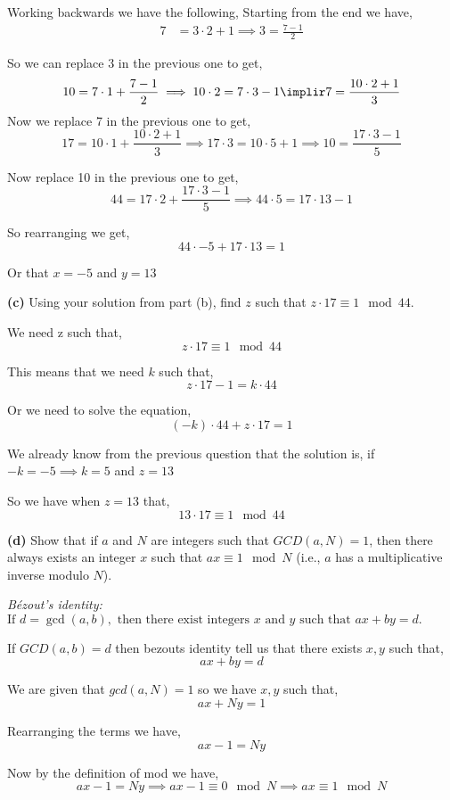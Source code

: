 \documentclass[12pt]{article}
\newcommand{\question}[3][Q]{
\begin{description}
\item \textbf{#1{#2}} #3
\end{description}
}
\newcommand{\hint}[1]{{\footnotesize
    \begin{description}
    [leftmargin=3.3em,style=nextline]
        \item[Hint:] {#1}
    \end{description}}   
}
\begin{document}
\begin{answer}
    Working backwards we have the following, 
    Starting from the end we have, 
    \begin{align*}
        7 &= 3 \cdot 2 + 1 \implies 3 = \frac{7 - 1}{2}
    \end{align*}

    So we can replace $3$ in the previous one to get, 
    $$ 10 = 7 \cdot 1 + \frac{7 - 1}{2} \implies 10 \cdot 2 = 7 \cdot 3 - 1 \implir 7 = \frac{10 \cdot 2 + 1}{3} $$ 
    Now we replace 7 in the previous one to get, 
    $$ 17 = 10 \cdot 1 + \frac{10 \cdot 2 + 1}{3} \implies 17 \cdot 3 = 10 \cdot 5 + 1 \implies 10 = \frac{17\cdot 3 - 1}{5}$$

    Now replace 10 in the previous one to get, 
    $$ 44 = 17 \cdot 2 + \frac{17 \cdot 3 - 1}{5} \implies 44 \cdot 5 = 17 \cdot 13 - 1 $$ 

    So rearranging we get, 
    $$ 44 \cdot -5 + 17 \cdot 13 = 1 $$ 

    Or that $x = -5$ and $y = 13$
    
\end{answer}

\question[]{(c)}{
    Using your solution from part (b), find $z$ such that $z \cdot 17 \equiv 1 \mod 44$.
}

\begin{answer}
    We need z such that, 
    $$ z \cdot 17 \equiv 1 \mod 44$$ 

    This means that we need $k$ such that,
    $$ z \cdot 17 - 1 = k \cdot 44 $$ 

    Or we need to solve the equation, 
    $$ (-k) \cdot 44  + z \cdot 17 = 1 $$ 

    We already know from the previous question that the solution is, if $-k = -5 \implies k = 5$ and  $z = 13$

    So we have when $z = 13$ that, 
    $$ 13 \cdot 17 \equiv 1 \mod 44 $$ 
\end{answer}

\question[]{(d)}{
    Show that if $a$ and $N$ are integers such that $GCD(a, N) = 1$, then there always exists an integer $x$ such that $ax \equiv 1 \mod N$ (i.e., $a$ has a multiplicative inverse modulo $N$).

    \hint{\textit{B\'{e}zout's identity:} $\text{If } d = \gcd(a, b), \text{ then there exist integers } x \text{ and } y \text{ such that } ax + by = d.$}
}

\begin{answer}
    If $GCD(a,b) = d$ then bezouts identity tell us that there exists  $x,y$ such that, 
    $$ ax + by = d $$ 

    We are given that $gcd(a,N) = 1$ so we have $x,y$ such that, 
    $$ ax + Ny = 1 $$ 

    Rearranging the terms we have, 
    $$ ax - 1 = Ny $$ 

    Now by the definition of mod we have, 
    $$ ax - 1 = Ny \implies ax - 1 \equiv 0 \mod N  \implies ax \equiv 1 \mod N$$ 

\end{answer}
\end{document}
